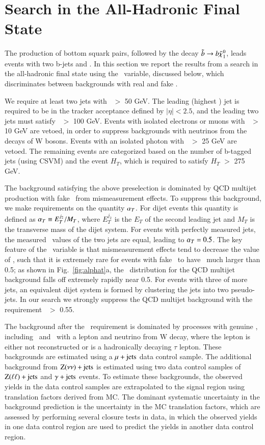 \section{Search in the All-Hadronic Final State}
\label{sec:alphat}

The production of bottom squark pairs, followed by the decay $\tilde{b}\to b\tilde{\chi}_{1}^{0}$, leads events with
two b-jets and \met. In this section we report the results from a search in the all-hadronic final state using the 
\alphat\ variable, discussed below, which discriminates between backgrounds with real and fake \met.

We require at least two jets with \pt\ $>$ 50 GeV. The leading (highest \pt) jet is required to be in the tracker 
acceptance defined by $|\eta|<2.5$, and the leading two jets must satisfy \pt\ $>$ 100 GeV. Events with isolated 
electrons or muons with \pt\ $>$ 10 GeV are vetoed, in order to suppress backgrounds with neutrinos from the decays 
of W bosons. Events with an isolated photon with \pt\ $>$ 25 GeV are vetoed.
The remaining events are categorized based on the number of b-tagged jets (using CSVM) and the event $H_T$, 
which is required to satisfy $H_T$ $>$ 275 GeV.

The background satisfying the above preselection is dominated by QCD multijet production with fake \met\ from mismeasurement effects. To suppress this background,
we make requirements on the quantity $\alpha_{T}$. For dijet events this quantity is defined as $\alpha_{T} \equiv E_{T}^{j_2} / M_{T}$, where $E_{T}^{j_2}$ is the $E_T$
of the second leading jet and $M_T$ is the transverse mass of the dijet system. 
For events with perfectly measured jets, the measured \pt\ values of the two jets are equal, leading to $\alpha_{T}=0.5$. The key feature of the \alphat\ variable
is that mismeasurement effects tend to decrease the value of \alphat, such that it is extremely rare for events with fake \met\ to have \alphat\
much larger than 0.5; as shown in Fig.~\ref{fig:alphat}a, the \alphat\ distribution for the QCD multijet background falls off extremely rapidly near 0.5.
For events with three of more jets, an equivalent dijet system is formed by  clustering the jets into two pseudo-jets. In our search we strongly suppress the
QCD multijet background with the requirement \alphat\ $>$ 0.55.

The background after the \alphat\ requirement is dominated by processes with genuine \met, including \ttljets\ and \wjets\ with a lepton and neutrino from W decay,
where the lepton is either not reconstructed or is a hadronically decaying $\tau$ lepton. 
These backgrounds are estimated using a $\mu+\rm{jets}$ data control sample.
The additional background from $\rm{Z}(\nu\nu)+\rm{jets}$ is estimated using two data control samples of $\rm{Z}(\ell\ell)+\rm{jets}$ and  $\gamma+\rm{jets}$ events. To estimate these backgrounds, the observed yields in the data control samples are extrapolated to the
signal region using translation factors derived from MC. The dominant systematic uncertainty in the background prediction is the uncertainty
in the MC translation factors, which are assessed by performing several closure tests in data, in which the observed yields in one data control region
are used to predict the yields in another data control region.

